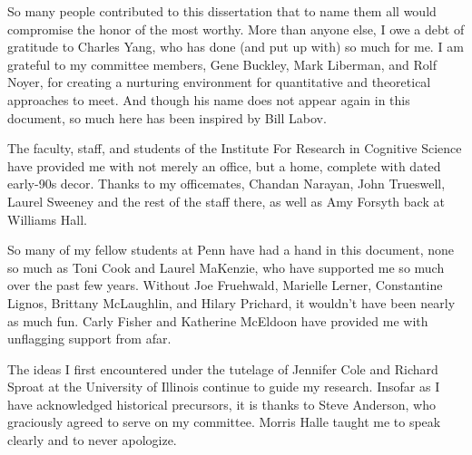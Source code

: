 So many people contributed to this dissertation that to name them all would compromise the honor of the most worthy. More than anyone else, I owe a debt of gratitude to Charles Yang, who has done (and put up with) so much for me. I am grateful to my committee members, Gene Buckley, Mark Liberman, and Rolf Noyer, for creating a nurturing environment for quantitative and theoretical approaches to meet. And though his name does not appear again in this document, so much here has been inspired by Bill Labov. 

The faculty, staff, and students of the Institute For Research in Cognitive Science have provided me with not merely an office, but a home, complete with dated early-90s decor. Thanks to my officemates, Chandan Narayan, John Trueswell, Laurel Sweeney and the rest of the staff there, as well as Amy Forsyth back at Williams Hall.

So many of my fellow students at Penn have had a hand in this document, none so much as Toni Cook and Laurel MaKenzie, who have supported me so much over the past few years. Without Joe Fruehwald, Marielle Lerner, Constantine Lignos, Brittany McLaughlin, and Hilary Prichard, it wouldn't have been nearly as much fun. Carly Fisher and Katherine McEldoon have provided me with unflagging support from afar.

The ideas I first encountered under the tutelage of Jennifer Cole and Richard Sproat at the University of Illinois continue to guide my research. Insofar as I have acknowledged historical precursors, it is thanks to Steve Anderson, who graciously agreed to serve on my committee. Morris Halle taught me to speak clearly and to never apologize.
